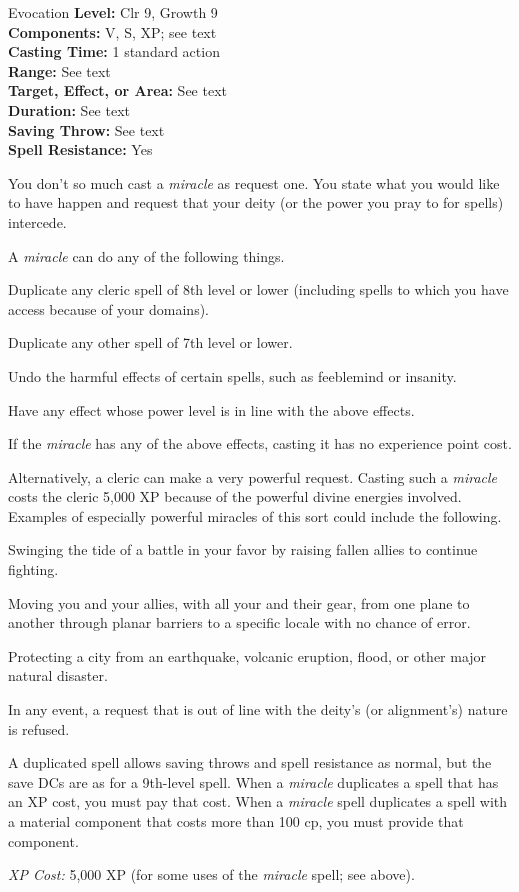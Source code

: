 {Evocation}
{
	\textbf{Level:}
	Clr 9, Growth 9\\
	\textbf{Components:}
	V, S, XP; see text\\
	\textbf{Casting Time:}
	1 standard action\\
	\textbf{Range:}
	See text\\
	\textbf{Target, Effect, or Area:}
	See text\\
	\textbf{Duration:}
	See text\\
	\textbf{Saving Throw:}
	See text\\
	\textbf{Spell Resistance:}
	Yes\\
}
{
	You don't so much cast a \emph{miracle} as request one. You state what you would like to have happen and request that your deity (or the power you pray to for spells) intercede.

	A \emph{miracle} can do any of the following things.

	\begin{itemize*}
	\item Duplicate any cleric spell of 8th level or lower (including spells to which you have access because of your domains).
	\item Duplicate any other spell of 7th level or lower.
	\item Undo the harmful effects of certain spells, such as feeblemind or insanity.
	\item Have any effect whose power level is in line with the above effects.
	\end{itemize*}

	If the \emph{miracle} has any of the above effects, casting it has no experience point cost.

	Alternatively, a cleric can make a very powerful request. Casting such a \emph{miracle} costs the cleric 5,000 XP because of the powerful divine energies involved. Examples of especially powerful miracles of this sort could include the following.

	\begin{itemize*}
	\item Swinging the tide of a battle in your favor by raising fallen allies to continue fighting.
	\item Moving you and your allies, with all your and their gear, from one plane to another through planar barriers to a specific locale with no chance of error.
	\item Protecting a city from an earthquake, volcanic eruption, flood, or other major natural disaster.
	\end{itemize*}

	In any event, a request that is out of line with the deity's (or alignment's) nature is refused.

	A duplicated spell allows saving throws and spell resistance as normal, but the save DCs are as for a 9th-level spell. When a \emph{miracle} duplicates a spell that has an XP cost, you must pay that cost. When a \emph{miracle} spell duplicates a spell with a material component that costs more than 100 cp, you must provide that component.

	\textit{XP Cost:}
	5,000 XP (for some uses of the \emph{miracle} spell; see above).

}
